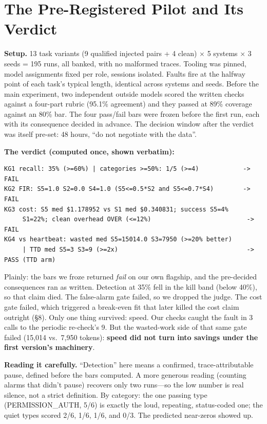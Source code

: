 \documentclass[acmsmall,screen]{acmart}
\begin{document}
\section{The Pre-Registered Pilot and Its Verdict}
\textbf{Setup.} 13 task variants (9 qualified injected pairs + 4 clean) $\times$
5 systems $\times$ 3 seeds = 195 runs, all banked, with no malformed traces.
Tooling was pinned, model assignments fixed per role, sessions isolated. Faults
fire at the halfway point of each task's typical length, identical across
systems and seeds. Before the main experiment, two independent outside models
scored the written checks against a four-part rubric (95.1\% agreement) and they
passed at 89\% coverage against an 80\% bar. The four pass/fail bars were frozen
before the first run, each with its consequence decided in advance. The decision
window after the verdict was itself pre-set: 48 hours, ``do not negotiate with
the data''.

\textbf{The verdict (computed once, shown verbatim):}

\begin{lstlisting}
KG1 recall: 35% (>=60%) | categories >=50%: 1/5 (>=4)            -> FAIL
KG2 FIR: S5=1.0 S2=0.0 S4=1.0 (S5<=0.5*S2 and S5<=0.7*S4)        -> FAIL
KG3 cost: S5 med $1.178952 vs S1 med $0.340831; success S5=4%
     S1=22%; clean overhead OVER (<=12%)                          -> FAIL
KG4 vs heartbeat: wasted med S5=15014.0 S3=7950 (>=20% better)
     | TTD med S5=3 S3=9 (>=2x)                                   -> PASS (TTD arm)
\end{lstlisting}

Plainly: the bars we froze returned \emph{fail} on our own flagship, and the
pre-decided consequences ran as written. Detection at 35\% fell in the kill
band (below 40\%), so that claim died. The false-alarm gate failed, so we
dropped the judge. The cost gate failed, which triggered a break-even fit that
later killed the cost claim outright (\S8). Only one thing survived: speed. Our
checks caught the fault in 3 calls to the periodic re-check's 9. But the
wasted-work side of that same gate failed (15,014 vs.\ 7,950 tokens):
\textbf{speed did not turn into savings under the first version's machinery}.

\textbf{Reading it carefully.} ``Detection'' here means a confirmed,
trace-attributable pause, defined before the bars computed. A more generous
reading (counting alarms that didn't pause) recovers only two runs---so the low
number is real silence, not a strict definition. By category: the one passing
type (PERMISSION\_AUTH, 5/6) is exactly the loud, repeating, status-coded one;
the quiet types scored 2/6, 1/6, 1/6, and 0/3. The predicted near-zeros showed
up.
\end{document}
